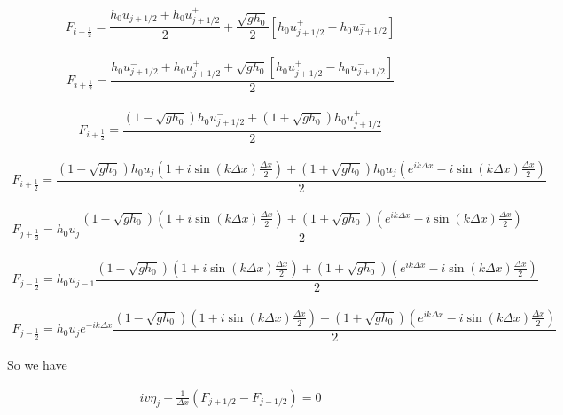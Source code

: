 \documentclass[12pt]{article}
\begin{document}
\begin{gather}
F_{i+\frac{1}{2}} = \dfrac{h_0 u^-_{j + 1/2} +  h_0 u^+_{j + 1/2}}{2}  + \dfrac{\sqrt{g h_0}}{2} \left [  h_0 u^+_{j + 1/2} -  h_0 u^-_{j + 1/2} \right ]
\end{gather}

\begin{gather}
F_{i+\frac{1}{2}} = \dfrac{h_0 u^-_{j + 1/2} +  h_0 u^+_{j + 1/2}  + \sqrt{g h_0} \left [  h_0 u^+_{j + 1/2} -  h_0 u^-_{j + 1/2} \right ]}{2}
\end{gather}

\begin{gather}
F_{i+\frac{1}{2}} = \dfrac{\left(1 - \sqrt{g h_0}\right)h_0 u^-_{j + 1/2} + \left(1 + \sqrt{g h_0}\right) h_0 u^+_{j + 1/2} }{2}
\end{gather}

\begin{gather}
F_{i+\frac{1}{2}} = \dfrac{\left(1 - \sqrt{g h_0}\right)h_0 u_j\left(1 + i\sin\left(k \Delta x\right) \frac{\Delta x}{2} \right) + \left(1 + \sqrt{g h_0}\right) h_0 u_j\left(e^{ik\Delta x} -  i\sin\left(k \Delta x\right) \frac{\Delta x}{2} \right) }{2}
\end{gather}

\begin{gather}
F_{j+\frac{1}{2}} = h_0 u_j\dfrac{\left(1 - \sqrt{g h_0}\right)\left(1 + i\sin\left(k \Delta x\right) \frac{\Delta x}{2} \right) + \left(1 + \sqrt{g h_0}\right)\left(e^{ik\Delta x} -  i\sin\left(k \Delta x\right) \frac{\Delta x}{2} \right) }{2}
\end{gather}
 
 \begin{gather}
 F_{j-\frac{1}{2}} = h_0 u_{j-1}\dfrac{\left(1 - \sqrt{g h_0}\right)\left(1 + i\sin\left(k \Delta x\right) \frac{\Delta x}{2} \right) + \left(1 + \sqrt{g h_0}\right)\left(e^{ik\Delta x} -  i\sin\left(k \Delta x\right) \frac{\Delta x}{2} \right) }{2}
 \end{gather}
 
  \begin{gather}
  F_{j-\frac{1}{2}} = h_0 u_{j}e^{-ik\Delta x}\dfrac{\left(1 - \sqrt{g h_0}\right)\left(1 + i\sin\left(k \Delta x\right) \frac{\Delta x}{2} \right) + \left(1 + \sqrt{g h_0}\right)\left(e^{ik\Delta x} -  i\sin\left(k \Delta x\right) \frac{\Delta x}{2} \right) }{2}
  \end{gather}
  
  So we have
 
\begin{multline}
iv\eta_j +  \frac{1}{\Delta x}\left(F_{j+1/2} - F_{j-1/2} \right) = 0
\end{multline}
\end{document}

